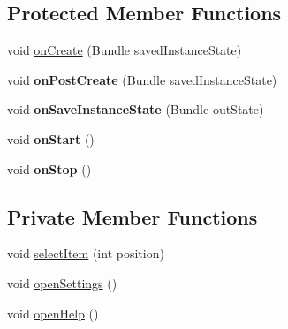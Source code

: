 \subsection*{Protected Member Functions}
\begin{DoxyCompactItemize}
\item 
void \hyperlink{classcom_1_1qualoutdoor_1_1recorder_1_1MainActivity_ac9e15af94bc29b6343dc2ffe24afe995}{on\-Create} (Bundle saved\-Instance\-State)
\item 
\hypertarget{classcom_1_1qualoutdoor_1_1recorder_1_1MainActivity_afdde657fd9139073075a608bd87250c0}{void {\bfseries on\-Post\-Create} (Bundle saved\-Instance\-State)}\label{classcom_1_1qualoutdoor_1_1recorder_1_1MainActivity_afdde657fd9139073075a608bd87250c0}

\item 
\hypertarget{classcom_1_1qualoutdoor_1_1recorder_1_1MainActivity_a465de11fed8d5c14a2ac4b458aa3985f}{void {\bfseries on\-Save\-Instance\-State} (Bundle out\-State)}\label{classcom_1_1qualoutdoor_1_1recorder_1_1MainActivity_a465de11fed8d5c14a2ac4b458aa3985f}

\item 
\hypertarget{classcom_1_1qualoutdoor_1_1recorder_1_1MainActivity_a06e1f42c4fb946ecc3a6615d6c09a7fc}{void {\bfseries on\-Start} ()}\label{classcom_1_1qualoutdoor_1_1recorder_1_1MainActivity_a06e1f42c4fb946ecc3a6615d6c09a7fc}

\item 
\hypertarget{classcom_1_1qualoutdoor_1_1recorder_1_1MainActivity_a7eb3920b7c54fc3e130c85f7f50f1c87}{void {\bfseries on\-Stop} ()}\label{classcom_1_1qualoutdoor_1_1recorder_1_1MainActivity_a7eb3920b7c54fc3e130c85f7f50f1c87}

\end{DoxyCompactItemize}
\subsection*{Private Member Functions}
\begin{DoxyCompactItemize}
\item 
void \hyperlink{classcom_1_1qualoutdoor_1_1recorder_1_1MainActivity_a70960558ff7463002c78d0f02e654263}{select\-Item} (int position)
\item 
void \hyperlink{classcom_1_1qualoutdoor_1_1recorder_1_1MainActivity_ae63f4ccd23f5892a3cea9c0c8d4aa852}{open\-Settings} ()
\item 
void \hyperlink{classcom_1_1qualoutdoor_1_1recorder_1_1MainActivity_a38c1ce314020110983c35515d9f34e48}{open\-Help} ()
\end{DoxyCompactItemize}
